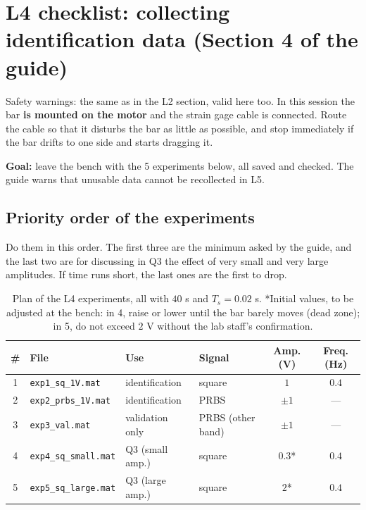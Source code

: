 \documentclass[a4paper,11pt]{article}
\begin{document}
\section*{L4 checklist: collecting identification data (Section 4 of the guide)}

Safety warnings: the same as in the L2 section, valid here too.
In this session the bar \textbf{is mounted on the motor} and the strain gage cable is connected.
Route the cable so that it disturbs the bar as little as possible, and stop immediately if the bar drifts to one side and starts dragging it.

\textbf{Goal:} leave the bench with the 5 experiments below, all saved and checked.
The guide warns that unusable data cannot be recollected in L5.

\subsection*{Priority order of the experiments}

Do them in this order.
The first three are the minimum asked by the guide, and the last two are for discussing in Q3 the effect of very small and very large amplitudes.
If time runs short, the last ones are the first to drop.

\begin{table}[H]
  \centering
  \small
  \setlength{\tabcolsep}{4pt}
  \renewcommand{\arraystretch}{1.6}
  \begin{tabular}{|c|l|l|l|c|c|}
    \hline
    \textbf{\#} & \textbf{File} & \textbf{Use} & \textbf{Signal} & \textbf{Amp. (V)} & \textbf{Freq. (Hz)} \\
    \hline
    1 & \texttt{exp1\_sq\_1V.mat} & identification & square & $1$ & $0.4$ \\
    \hline
    2 & \texttt{exp2\_prbs\_1V.mat} & identification & PRBS & $\pm 1$ & --- \\
    \hline
    3 & \texttt{exp3\_val.mat} & validation only & PRBS (other band) & $\pm 1$ & --- \\
    \hline
    4 & \texttt{exp4\_sq\_small.mat} & Q3 (small amp.) & square & $0.3$* & $0.4$ \\
    \hline
    5 & \texttt{exp5\_sq\_large.mat} & Q3 (large amp.) & square & $2$* & $0.4$ \\
    \hline
  \end{tabular}
  \caption{Plan of the L4 experiments, all with $40$ s and $T_s=0.02$ s.
  *Initial values, to be adjusted at the bench: in 4, raise or lower until the bar barely moves (dead zone); in 5, do not exceed $2$ V without the lab staff's confirmation.}
\end{table}
\end{document}
